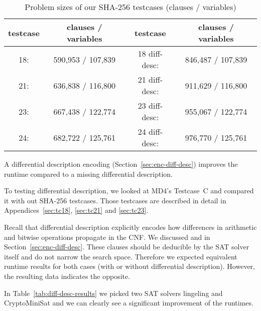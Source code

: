 \begin{table}[!h]
  \begin{center}
    \begin{tabular}{cc|cc}
        \textbf{testcase} & \textbf{clauses / variables} & \textbf{testcase} & \textbf{clauses / variables} \\
      \hline
        18: & 590,953 / 107,839 & 18 diff-desc: & 846,487 / 107,839 \\
        21: & 636,838 / 116,800 & 21 diff-desc: & 911,629 / 116,800 \\
        23: & 667,438 / 122,774 & 23 diff-desc: & 955,067 / 122,774 \\
        24: & 682,722 / 125,761 & 24 diff-desc: & 976,770 / 125,761 \\
    \end{tabular}
    \caption{Problem sizes of our SHA-256 testcases (clauses / variables)}
    \label{tab:problem-sizes}
  \end{center}
\end{table}

\begin{prop}
  A differential description encoding (Section~\ref{sec:enc-diff-desc})
  improves the runtime compared to a missing differential description.
\end{prop}

To testing differential description, we looked at MD4's Testcase~C
and compared it with out SHA-256 testcases. Those testcases
are described in detail in Appendices~\ref{sec:tc18}, \ref{sec:tc21}
and \ref{sec:tc23}.

Recall that differential description explicitly encodes
how differences in arithmetic and bitwise operations propagate in the CNF.
We discussed  and  in Section~\ref{sec:enc-diff-desc}.
These clauses should be deducible by the SAT solver itself and
do not narrow the search space. Therefore we expected equivalent
runtime results for both cases (with or without differential description).
However, the resulting data indicates the opposite.

In Table~\ref{tab:diff-desc-results} we picked two SAT solvers lingeling
and CryptoMiniSat and we can clearly see a significant improvement of the runtimes.

